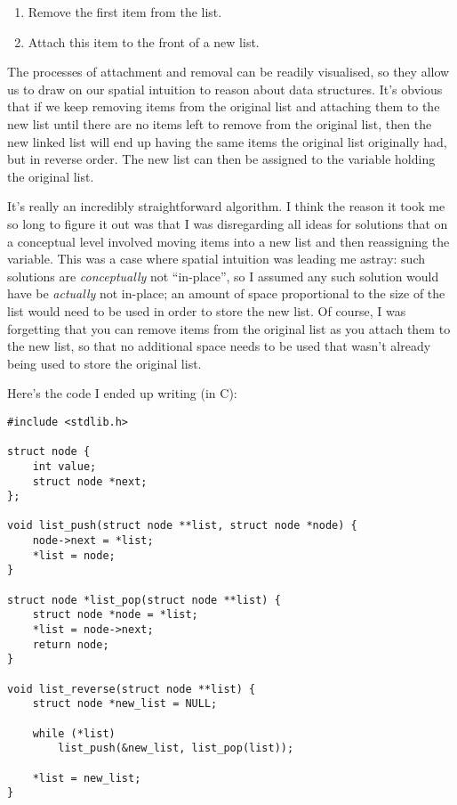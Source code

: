 \documentclass{amsart}
\begin{document}
\begin{enumerate}
    \item Remove the first item from the list.
    \item Attach this item to the front of a new list.
\end{enumerate}

The processes of attachment and removal can be readily visualised, so they allow us to draw on our spatial intuition to reason about data structures. It's obvious that if we keep removing items from the original list and attaching them to the new list until there are no items left to remove from the original list, then the new linked list will end up having the same items the original list originally had, but in reverse order. The new list can then be assigned to the variable holding the original list.

It's really an incredibly straightforward algorithm. I think the reason it took me so long to figure it out was that I was disregarding all ideas for solutions that on a conceptual level involved moving items into a new list and then reassigning the variable. This was a case where spatial intuition was leading me astray: such solutions are \emph{conceptually} not ``in-place'', so I assumed any such solution would have be \emph{actually} not in-place; an amount of space proportional to the size of the list would need to be used in order to store the new list. Of course, I was forgetting that you can remove items from the original list as you attach them to the new list, so that no additional space needs to be used that wasn't already being used to store the original list.

Here's the code I ended up writing (in C):

\begin{verbatim}
#include <stdlib.h>

struct node {
    int value;
    struct node *next;
};

void list_push(struct node **list, struct node *node) {
    node->next = *list;
    *list = node;
}

struct node *list_pop(struct node **list) {
    struct node *node = *list;
    *list = node->next;
    return node;
}

void list_reverse(struct node **list) {
    struct node *new_list = NULL;
    
    while (*list)
        list_push(&new_list, list_pop(list));
    
    *list = new_list;
}
\end{verbatim}
\end{document}
